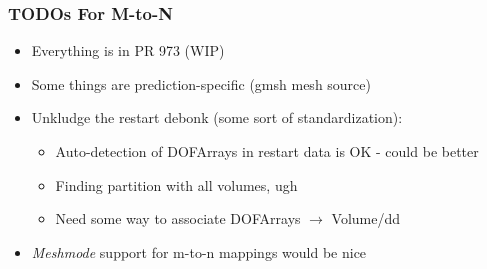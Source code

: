 \begin{frame}
\begin{minipage}[b][.4\textheight][t]{\textwidth}
  \end{minipage}
\end{frame}

\begin{frame}\frametitle{TODOs For M-to-N}
  \begin{itemize}
  \item Everything is in \mirgecom{} PR 973 (WIP)
  \item Some things are prediction-specific (gmsh mesh source)
  \item Unkludge the restart debonk (some sort of standardization):
    \begin{itemize}
    \item Auto-detection of DOFArrays in restart data is OK - could be better
    \item Finding partition with all volumes, ugh
    \item Need some way to associate DOFArrays $\rightarrow$ Volume/dd
    \end{itemize}
  \item \textit{Meshmode} support for m-to-n mappings would be nice 
  \end{itemize}
\end{frame}
